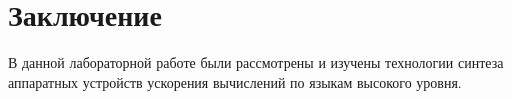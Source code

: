 \chapter*{Заключение}

В данной лабораторной работе были рассмотрены и изучены технологии синтеза аппаратных устройств ускорения вычислений по языкам высокого уровня. 